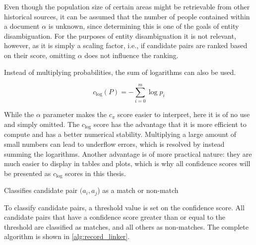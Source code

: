 Even though the population size of certain areas might be retrievable from other historical sources, it can be assumed that the number of people contained within a document $\alpha$ is unknown, since determining this is one of the goals of entity disambiguation.
For the purposes of entity disambiguation it is not relevant, however, as it is simply a scaling factor, i.e., if candidate pairs are ranked based on their score, omitting $\alpha$ does not influence the ranking.

Instead of multiplying probabilities, the sum of logarithms can also be used.

\begin{equation}
    c_{\mathrm{log}}(P) = -\sum_{i=0}^{m} \log{p_i}
    \label{eq:confidence1}
\end{equation}

\noindent While the $\alpha$ parameter makes the $c_{\pi}$ score easier to interpret, here it is of no use and simply omitted.
The $c_{\mathrm{log}}$ score has the advantage that it is more efficient to compute and has a better numerical stability.
Multiplying a large amount of small numbers can lead to underflow errors, which is resolved by instead summing the logarithms.
Another advantage is of more practical nature: they are much easier to display in tables and plots, which is why all confidence scores will be presented as $c_{\mathrm{log}}$ scores in this thesis.

\begin{algorithm}
    \caption{Classifies candidate pair $(a_i, a_j$) as a match or non-match}
    \label{alg:record_linker}
    
\end{algorithm}

To classify candidate pairs, a threshold value is set on the confidence score.
All candidate pairs that have a confidence score greater than or equal to the threshold are classified as matches, and all others as non-matches.
The complete algorithm is shown in \cref{alg:record_linker}.